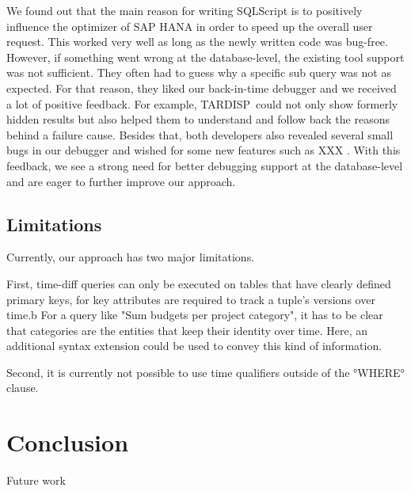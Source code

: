 \documentclass[english]{sig-alternate-05-2015}
\newcommand{\todo}[2][]{\pdfmargincomment[author={#1}]{#2}}
\newcommand{\tool}{TARDISP}
\begin{document}
We found out that the main reason for writing SQLScript is to positively influence the optimizer of SAP HANA in order to speed up the overall user request.
This worked very well as long as the newly written code was bug-free. 
However, if something went wrong at the database-level, the existing tool support was not sufficient. 
They often had to guess why a specific sub query was not as expected. 
For that reason, they liked our back-in-time debugger and we received a lot of positive feedback.
For example, \tool\, could not only show formerly hidden results but also helped them to understand and follow back the reasons behind a failure cause. 
Besides that, both developers also revealed several small bugs in our debugger and wished for some new features such as XXX \todo{please add a specific feature here}.
With this feedback, we see a strong need for better debugging support at the database-level and are eager to further improve our approach.


\subsection{Limitations}

Currently, our approach has two major limitations.

First, time-diff queries can only be executed on tables that have clearly defined primary keys, for key attributes are required to track a tuple's versions over time.b
For a query like "Sum budgets per project category", it has to be clear that categories are the entities that keep their identity over time.
Here, an additional syntax extension could be used to convey this kind of information.

Second, it is currently not possible to use time qualifiers outside of the °WHERE° clause.



\section{Conclusion}
\label{sec:conclusion}


Future work

%

\end{document}
